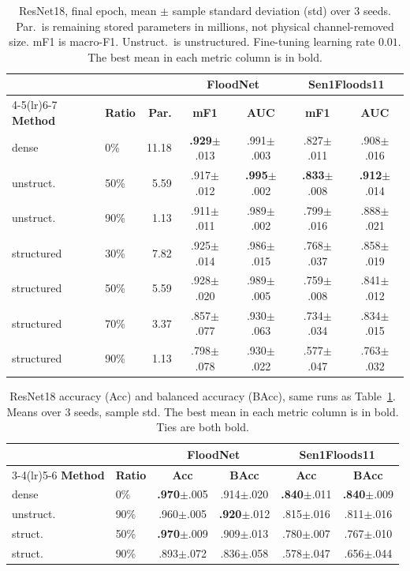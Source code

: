 \documentclass[conference]{IEEEtran}
\begin{document}
\begin{table}[t]
\centering
\caption{ResNet18, final epoch, mean $\pm$ sample standard deviation
(std) over 3 seeds. Par.\ is remaining stored parameters in millions,
not physical channel-removed size. mF1 is macro-F1. Unstruct.\ is
unstructured. Fine-tuning learning rate $0.01$. The best mean in each
metric column is in bold.}
\label{tab:resnet}
\footnotesize
\setlength{\tabcolsep}{1.5pt}
\begin{tabular}{llr cc cc}
\toprule
& & & \multicolumn{2}{c}{\textbf{FloodNet}} &
\multicolumn{2}{c}{\textbf{Sen1Floods11}}\\
\cmidrule(lr){4-5}\cmidrule(lr){6-7}
\textbf{Method} & \textbf{Ratio} & \textbf{Par.} &
\textbf{mF1} & \textbf{AUC} & \textbf{mF1} & \textbf{AUC}\\
\midrule
dense      & 0\%  & 11.18 & \textbf{.929}$\pm$.013 & .991$\pm$.003 & .827$\pm$.011 & .908$\pm$.016\\
unstruct.  & 50\% &  5.59 & .917$\pm$.012 & \textbf{.995}$\pm$.002 & \textbf{.833}$\pm$.008 & \textbf{.912}$\pm$.014\\
unstruct.  & 90\% &  1.13 & .911$\pm$.011 & .989$\pm$.002 & .799$\pm$.016 & .888$\pm$.021\\
structured & 30\% &  7.82 & .925$\pm$.014 & .986$\pm$.015 & .768$\pm$.037 & .858$\pm$.019\\
structured & 50\% &  5.59 & .928$\pm$.020 & .989$\pm$.005 & .759$\pm$.008 & .841$\pm$.012\\
structured & 70\% &  3.37 & .857$\pm$.077 & .930$\pm$.063 & .734$\pm$.034 & .834$\pm$.015\\
structured & 90\% &  1.13 & .798$\pm$.078 & .930$\pm$.022 & .577$\pm$.047 & .763$\pm$.032\\
\bottomrule
\end{tabular}
\end{table}

\begin{table}[t]
\centering
\caption{ResNet18 accuracy (Acc) and balanced accuracy (BAcc), same
runs as Table~\ref{tab:resnet}. Means over 3 seeds, sample std. The
best mean in each metric column is in bold. Ties are both bold.}
\label{tab:acc}
\footnotesize
\setlength{\tabcolsep}{3.2pt}
\begin{tabular}{llcccc}
\toprule
& & \multicolumn{2}{c}{\textbf{FloodNet}} &
\multicolumn{2}{c}{\textbf{Sen1Floods11}}\\
\cmidrule(lr){3-4}\cmidrule(lr){5-6}
\textbf{Method} & \textbf{Ratio} & \textbf{Acc} & \textbf{BAcc} &
\textbf{Acc} & \textbf{BAcc}\\
\midrule
dense     & 0\%  & \textbf{.970}$\pm$.005 & .914$\pm$.020 & \textbf{.840}$\pm$.011 & \textbf{.840}$\pm$.009\\
unstruct. & 90\% & .960$\pm$.005 & \textbf{.920}$\pm$.012 & .815$\pm$.016 & .811$\pm$.016\\
struct.   & 50\% & \textbf{.970}$\pm$.009 & .909$\pm$.013 & .780$\pm$.007 & .767$\pm$.010\\
struct.   & 90\% & .893$\pm$.072 & .836$\pm$.058 & .578$\pm$.047 & .656$\pm$.044\\
\bottomrule
\end{tabular}
\end{table}
\end{document}
